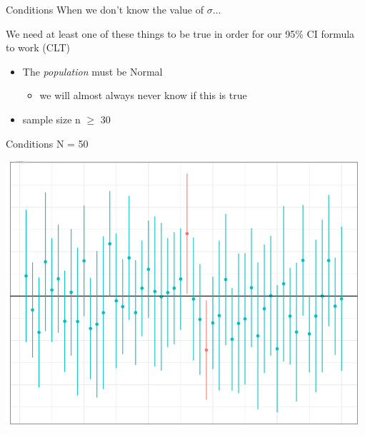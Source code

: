 \documentclass{beamer}
\begin{document}
\begin{frame}{Conditions}
When we don't know the value of $\sigma$... \vspace{15mm}

We need at least one of these things to be true in order for our 95\% CI formula to work (CLT)
\begin{itemize}
    \item The \textit{population} must be Normal
        \begin{itemize}
            \item we will almost always never know if this is true
        \end{itemize}
    \item sample size n $\geq$ 30
\end{itemize}
\end{frame}

\begin{frame}{Conditions}
\scriptsize \hspace{15mm} N = 50 \vspace{-1mm}
\begin{center}
\includegraphics[scale=0.68]{n50.png}
\end{center}
\end{frame}
\end{document}
